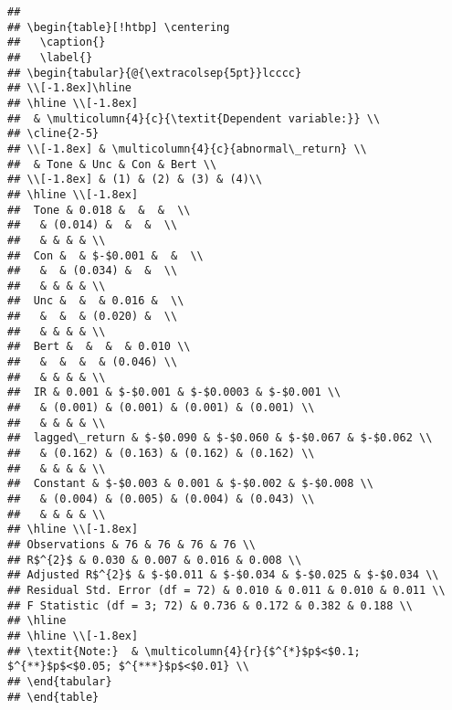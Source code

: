 \documentclass[
]{article}
\begin{document}
\begin{verbatim}
## 
## \begin{table}[!htbp] \centering 
##   \caption{} 
##   \label{} 
## \begin{tabular}{@{\extracolsep{5pt}}lcccc} 
## \\[-1.8ex]\hline 
## \hline \\[-1.8ex] 
##  & \multicolumn{4}{c}{\textit{Dependent variable:}} \\ 
## \cline{2-5} 
## \\[-1.8ex] & \multicolumn{4}{c}{abnormal\_return} \\ 
##  & Tone & Unc & Con & Bert \\ 
## \\[-1.8ex] & (1) & (2) & (3) & (4)\\ 
## \hline \\[-1.8ex] 
##  Tone & 0.018 &  &  &  \\ 
##   & (0.014) &  &  &  \\ 
##   & & & & \\ 
##  Con &  & $-$0.001 &  &  \\ 
##   &  & (0.034) &  &  \\ 
##   & & & & \\ 
##  Unc &  &  & 0.016 &  \\ 
##   &  &  & (0.020) &  \\ 
##   & & & & \\ 
##  Bert &  &  &  & 0.010 \\ 
##   &  &  &  & (0.046) \\ 
##   & & & & \\ 
##  IR & 0.001 & $-$0.001 & $-$0.0003 & $-$0.001 \\ 
##   & (0.001) & (0.001) & (0.001) & (0.001) \\ 
##   & & & & \\ 
##  lagged\_return & $-$0.090 & $-$0.060 & $-$0.067 & $-$0.062 \\ 
##   & (0.162) & (0.163) & (0.162) & (0.162) \\ 
##   & & & & \\ 
##  Constant & $-$0.003 & 0.001 & $-$0.002 & $-$0.008 \\ 
##   & (0.004) & (0.005) & (0.004) & (0.043) \\ 
##   & & & & \\ 
## \hline \\[-1.8ex] 
## Observations & 76 & 76 & 76 & 76 \\ 
## R$^{2}$ & 0.030 & 0.007 & 0.016 & 0.008 \\ 
## Adjusted R$^{2}$ & $-$0.011 & $-$0.034 & $-$0.025 & $-$0.034 \\ 
## Residual Std. Error (df = 72) & 0.010 & 0.011 & 0.010 & 0.011 \\ 
## F Statistic (df = 3; 72) & 0.736 & 0.172 & 0.382 & 0.188 \\ 
## \hline 
## \hline \\[-1.8ex] 
## \textit{Note:}  & \multicolumn{4}{r}{$^{*}$p$<$0.1; $^{**}$p$<$0.05; $^{***}$p$<$0.01} \\ 
## \end{tabular} 
## \end{table}
\end{verbatim}
\end{document}
